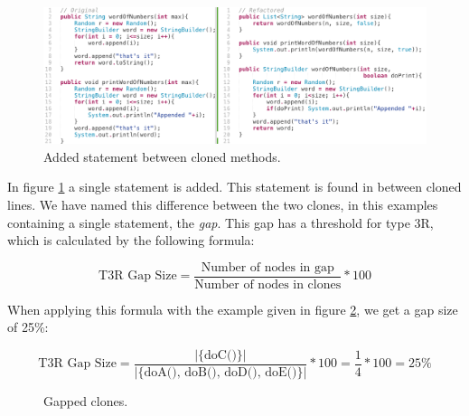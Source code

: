 \begin{figure}[H]
  \centering
  \includegraphics[width=1\columnwidth]{img/type3_3}
  \caption{Added statement between cloned methods.}
  \label{fig:type3}
\end{figure}

In figure \ref{fig:type3} a single statement is added. This statement is found in between cloned lines. We have named this difference between the two clones, in this examples containing a single statement, the \textit{gap}. This gap has a threshold for type 3R, which is calculated by the following formula:

\begin{equation}\label{eq:type3r}
\text{T3R Gap Size}=\frac{\text{Number of nodes in gap}}{\text{Number of nodes in clones}}*100
\end{equation}

When applying this formula with the example given in figure \ref{fig:gappedclones}, we get a gap size of 25\%:

\begin{equation}\label{eq:type3r}
\text{T3R Gap Size}=\frac{\text{|\{doC()\}|}}{\text{|\{doA(), doB(), doD(), doE()\}|}}*100 = \frac{\text{1}}{\text{4}}*100 = 25\%
\end{equation}

\begin{figure}[H]
\begin{parcolumns}{2}
\end{parcolumns}
\caption{Gapped clones.}
\label{fig:gappedclones}
\end{figure}

